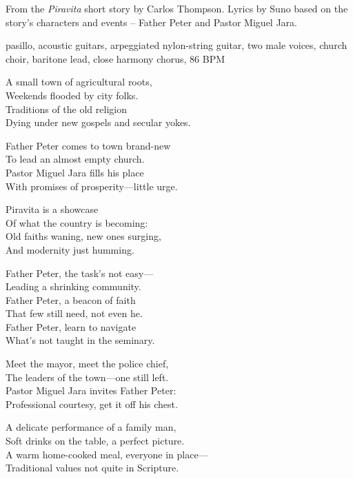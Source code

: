
\label{sec:piravita-view}
\begin{notes}
From the \emph{Piravita} short story by Carlos Thompson. Lyrics by Suno based on the story's characters and events -- Father Peter and Pastor Miguel Jara.
\end{notes}
\begin{style}
pasillo, acoustic guitars, arpeggiated nylon-string guitar, two male voices, church choir, baritone lead, close harmony chorus, 86 BPM
\end{style}
\begin{lyrics}
A small town of agricultural roots,\\
Weekends flooded by city folks.\\
Traditions of the old religion\\
Dying under new gospels and secular yokes.

Father Peter comes to town brand-new\\
To lead an almost empty church.\\
Pastor Miguel Jara fills his place\\
With promises of prosperity—little urge.

Piravita is a showcase\\
Of what the country is becoming:\\
Old faiths waning, new ones surging,\\
And modernity just humming.

Father Peter, the task’s not easy—\\
Leading a shrinking community.\\
Father Peter, a beacon of faith\\
That few still need, not even he.\\
Father Peter, learn to navigate\\
What’s not taught in the seminary.

Meet the mayor, meet the police chief,\\
The leaders of the town—one still left.\\
Pastor Miguel Jara invites Father Peter:\\
Professional courtesy, get it off his chest.

A delicate performance of a family man,\\
Soft drinks on the table, a perfect picture.\\
A warm home-cooked meal, everyone in place—\\
Traditional values not quite in Scripture.


\end{lyrics}
